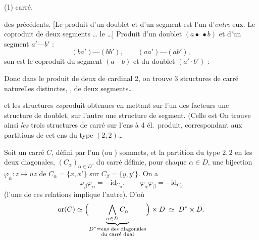 \documentclass[11pt,a4paper]{article}
\begin{document}
(1) carré.

 des précédents. [Le produit d'un doublet et d'un segment \struck{\ill{}}   est l'un d'\emph{entre} eux. Le coproduit de deux segments …{} le    \ill{} …] Produit d'un doublet $(a\bullet\ \bullet b)$ et d'un segment $a'\text{---}b'$ :
\[
  (ba')\text{---}(bb'),\qquad (aa')\text{---}(ab'),
\]
son  est le coproduit du segment $(a\text{---}b)$ et du doublet $(a'\cdot b')$ :

Donc dans le produit de deux  de cardinal 2, on trouve 3 structures de carré naturelles distinctes, \struck{\ill{}} \uncertain{2 \ill{}},  de deux segments…

 et les structures \emph{co}produit obtenues en mettant sur l'un des facteurs une structure de doublet, sur l'autre une structure de segment. (Celle  \emph{}  est
On trouve ainsi \emph{les} trois  structures de carré sur l'ens à 4 él.\ produit, correspondant aux partitions de cet ens du type $(2,2)$…

Soit un carré $C$, défini par l'un (ou ) sommets, et la partition du type $2,2$  en les deux diagonales, $(C_{\alpha})_{\alpha\in D}$.  du carré définie, pour chaque $\alpha\in D$,  une bijection $\varphi_{\alpha}: z\mapsto uz$ de $C_{\alpha}=\{x,x'\}$ sur $C_{\beta}=\{y,y'\}$.
On a
\[
  \varphi_{\beta}\varphi_{\alpha}=-\mathrm{id}_{C_{\alpha}},\qquad \varphi_{\alpha}\varphi_{\beta}=-\mathrm{id}_{C_{\beta}}
\]
(l'une de ces relations implique l'autre). D'où
\[
  \mathrm{or}(C)\simeq\Bigl(\underbrace{\bigwedge_{\alpha\in D}C_{\alpha}}_{\substack{D^{*}=\text{ens des diagonales}\\ \text{du carré dual}}}\Bigr)\times D \;\simeq\; D^{*}\times D .
\]
\end{document}
